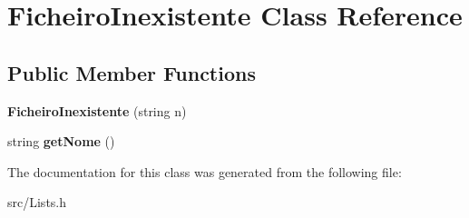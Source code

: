 \hypertarget{class_ficheiro_inexistente}{}\section{Ficheiro\+Inexistente Class Reference}
\label{class_ficheiro_inexistente}
\subsection*{Public Member Functions}
\begin{DoxyCompactItemize}
\item 
\hypertarget{class_ficheiro_inexistente_a39c3a505a18c2c9d2d641ea7ccd7ab80}{}{\bfseries Ficheiro\+Inexistente} (string n)\label{class_ficheiro_inexistente_a39c3a505a18c2c9d2d641ea7ccd7ab80}

\item 
\hypertarget{class_ficheiro_inexistente_a276cc949c9cea98e8cb41c6ef39b650d}{}string {\bfseries get\+Nome} ()\label{class_ficheiro_inexistente_a276cc949c9cea98e8cb41c6ef39b650d}

\end{DoxyCompactItemize}


The documentation for this class was generated from the following file\+:\begin{DoxyCompactItemize}
\item 
src/Lists.\+h\end{DoxyCompactItemize}
